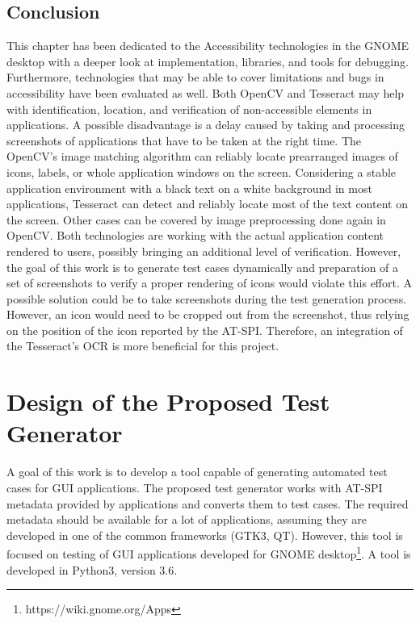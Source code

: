 \section{Conclusion}\label{ocr_conclusion}
This chapter has been dedicated to the Accessibility technologies in the GNOME desktop with a deeper look at implementation, libraries, and tools for debugging. Furthermore, technologies that may be able to cover limitations and bugs in accessibility have been evaluated as well. Both OpenCV and Tesseract may help with identification, location, and verification of non-accessible elements in applications. A possible disadvantage is a delay caused by taking and processing screenshots of applications that have to be taken at the right time. The OpenCV's image matching algorithm can reliably locate prearranged images of icons, labels, or whole application windows on the screen. Considering a stable application environment with a black text on a white background in most applications, Tesseract can detect and reliably locate most of the text content on the screen. Other cases can be covered by image preprocessing done again in OpenCV. Both technologies are working with the actual application content rendered to users, possibly bringing an additional level of verification. However, the goal of this work is to generate test cases dynamically and preparation of a set of screenshots to verify a proper rendering of icons would violate this effort. A possible solution could be to take screenshots during the test generation process. However, an icon would need to be cropped out from the screenshot, thus relying on the position of the icon reported by the AT-SPI. Therefore, an integration of the Tesseract's OCR is more beneficial for this project.

\chapter{Design of the Proposed Test Generator}\label{proposed_solution}
A goal of this work is to develop a tool capable of generating automated test cases for GUI applications. The proposed test generator works with AT-SPI metadata provided by applications and converts them to test cases. The required metadata should be available for a lot of applications, assuming they are developed in one of the common frameworks (GTK3, QT). However, this tool is focused on testing of GUI applications developed for GNOME desktop\footnote{https://wiki.gnome.org/Apps}. A tool is developed in Python3, version 3.6.

